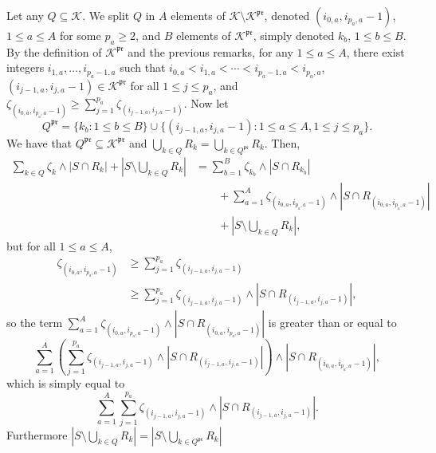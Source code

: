 \documentclass[
  11pt,
  a4paper,
]{article}
\theoremstyle{plain}
\theoremstyle{definition}
\theoremstyle{plain}
\theoremstyle{definition}
\theoremstyle{plain}
\theoremstyle{remark}
\begin{document}
Let any \(Q\subseteq \mathcal{K}\). We split \(Q\) in \(A\) elements of
\(\mathcal{K}\setminus\mathcal{K}^{\mathfrak{pr}}\), denoted
\((i_{0,a}, i_{p_a,a}-1)\), \(1\leq a\leq A\) for some \(p_a\geq2\), and
\(B\) elements of \(\mathcal{K}^{\mathfrak{pr}}\), simply denoted
\(k_b\), \(1\leq b\leq B\). By the definition of
\(\mathcal{K}^{\mathfrak{pr}}\) and the previous remarks, for any
\(1\leq a \leq A\), there exist integers \(i_{1,a},\dotsc,i_{p_a-1,a}\)
such that \(i_{0,a}<i_{1,a}<\dotsb<i_{p_a-1,a} < i_{p_a,a}\),
\((i_{j-1,a},i_{j,a}-1)\in\mathcal{K}^{\mathfrak{pr}}\) for all
\(1\leq j\leq p_a\), and
\(\zeta_{(i_{0,a}, i_{p_a,a}-1)}\geq \sum_{j=1}^{p_a}\zeta_{(i_{j-1,a},i_{j,a}-1)}\).
Now let \begin{equation}
Q^{\mathfrak{pr}}=\{k_b : 1\leq b\leq B \} \cup \{ (i_{j-1,a},i_{j,a}-1) :  1\leq a\leq A, 1\leq j\leq p_a  \}.
\label{eq_Qpr}
\end{equation} We have that
\(Q^{\mathfrak{pr}}\subseteq \mathcal{K}^{\mathfrak{pr}}\) and
\(\bigcup_{k\in Q}R_k=\bigcup_{k\in Q^{\mathfrak{pr}}}R_k\). Then,
\begin{align*}
\sum_{k\in Q}\zeta_k\wedge|S\cap R_k|+\left| S\setminus\bigcup_{k\in Q} R_k   \right|&=\sum_{b=1}^B\zeta_{k_b}\wedge|S\cap R_{k_b}| \\
&\qquad+\sum_{a=1}^A\zeta_{(i_{0,a}, i_{p_a,a}-1)}\wedge |S\cap R_{(i_{0,a}, i_{p_a,a}-1)}| \\
&\qquad+ \left| S\setminus\bigcup_{k\in Q} R_k   \right|    , 
\end{align*} but for all \(1\leq a\leq A\), \begin{align*}
\zeta_{(i_{0,a}, i_{p_a,a}-1)}&\geq  \sum_{j=1}^{p_a}\zeta_{(i_{j-1,a},i_{j,a}-1)} \\
&\geq   \sum_{j=1}^{p_a}\zeta_{(i_{j-1,a},i_{j,a}-1)} \wedge |S\cap R_{(i_{j-1,a}, i_{j,a}-1)}| ,
\end{align*} so the term
\(\sum_{a=1}^A\zeta_{(i_{0,a}, i_{p_a,a}-1)}\wedge |S\cap R_{(i_{0,a}, i_{p_a,a}-1)}|\)
is greater than or equal to \begin{equation*}
\sum_{a=1}^A\left(  \sum_{j=1}^{p_a}\zeta_{(i_{j-1,a},i_{j,a}-1)} \wedge |S\cap R_{(i_{j-1,a}, i_{j,a}-1)}| \right)\wedge |S\cap R_{(i_{0,a}, i_{p_a,a}-1)}| ,
\end{equation*} which is simply equal to \begin{equation*}
 \sum_{a=1}^A  \sum_{j=1}^{p_a}\zeta_{(i_{j-1,a},i_{j,a}-1)} \wedge |S\cap R_{(i_{j-1,a}, i_{j,a}-1)}|.
\end{equation*} Furthermore
\(\left|S\setminus\bigcup_{k\in Q} R_k\right|= \left|S\setminus\bigcup_{k\in Q^{\mathfrak{pr}}} R_k\right|\)
\end{document}
